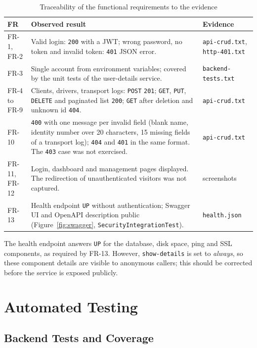 \begin{table}[H]
\centering\small
\caption{Traceability of the functional requirements to the evidence}\label{tab:fr-trace}
\begin{tabularx}{\linewidth}{@{}l>{\raggedright\arraybackslash}X>{\raggedright\arraybackslash}p{3.3cm}@{}}
\toprule
\textbf{FR} & \textbf{Observed result} & \textbf{Evidence} \\
\midrule
FR-1, FR-2 & Valid login: \texttt{200} with a JWT; wrong password, no token and invalid token: \texttt{401} JSON error. & \texttt{api-crud.txt}, \texttt{http-401.txt} \\
FR-3 & Single account from environment variables; covered by the unit tests of the user-details service. & \texttt{backend-tests.txt} \\
FR-4 to FR-9 & Clients, drivers, transport logs: \texttt{POST} \texttt{201}; \texttt{GET}, \texttt{PUT}, \texttt{DELETE} and paginated list \texttt{200}; \texttt{GET} after deletion and unknown id \texttt{404}. & \texttt{api-crud.txt} \\
FR-10 & \texttt{400} with one message per invalid field (blank name, identity number over 20 characters, 15 missing fields of a transport log); \texttt{404} and \texttt{401} in the same format. The \texttt{403} case was not exercised. & \texttt{api-crud.txt} \\
FR-11, FR-12 & Login, dashboard and management pages displayed. The redirection of unauthenticated visitors was not captured. & screenshots \\
FR-13 & Health endpoint \texttt{UP} without authentication; Swagger UI and OpenAPI description public (Figure~\ref{fig:swagger}, \texttt{SecurityIntegrationTest}). & \texttt{health.json} \\
\bottomrule
\end{tabularx}
\end{table}

The health endpoint answers \texttt{UP} for the database, disk space, ping and SSL components, as required by FR-13. However, \texttt{show-details} is set to \emph{always}, so these component details are visible to anonymous callers; this should be corrected before the service is exposed publicly.

\section{Automated Testing}

\subsection{Backend Tests and Coverage}

